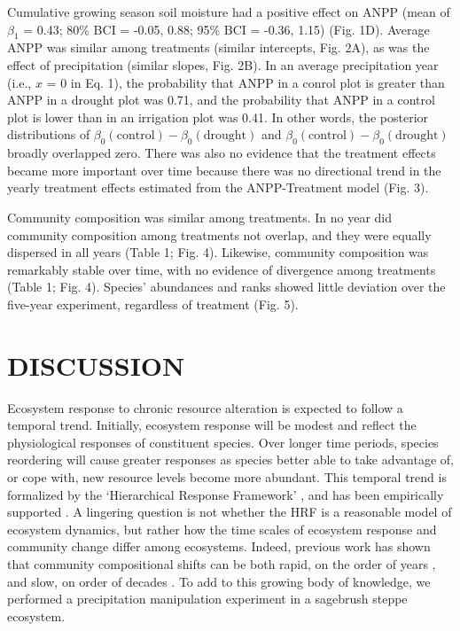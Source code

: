 \documentclass[fleqn,10pt]{wlpeerj} %
\begin{document}
Cumulative growing season soil moisture had a positive effect on ANPP
(mean of \(\beta_{1}\) = 0.43; 80\% BCI = -0.05, 0.88; 95\% BCI = -0.36,
1.15) (Fig. 1D). Average ANPP was similar among treatments (similar
intercepts, Fig. 2A), as was the effect of precipitation (similar
slopes, Fig. 2B). In an average precipitation year (i.e., \(x\) = 0 in
Eq. 1), the probability that ANPP in a conrol plot is greater than ANPP
in a drought plot was 0.71, and the probability that ANPP in a control
plot is lower than in an irrigation plot was 0.41. In other words, the
posterior distributions of
\(\beta_0(\text{control}) - \beta_0(\text{drought})\) and
\(\beta_0(\text{control}) - \beta_0(\text{drought})\) broadly overlapped
zero. There was also no evidence that the treatment effects became more
important over time because there was no directional trend in the yearly
treatment effects estimated from the ANPP-Treatment model (Fig. 3).

Community composition was similar among treatments. In no year did
community composition among treatments not overlap, and they were
equally dispersed in all years (Table 1; Fig. 4). Likewise, community
composition was remarkably stable over time, with no evidence of
divergence among treatments (Table 1; Fig. 4). Species' abundances and
ranks showed little deviation over the five-year experiment, regardless
of treatment (Fig. 5).

\section{DISCUSSION}\label{discussion}

Ecosystem response to chronic resource alteration is expected to follow
a temporal trend. Initially, ecosystem response will be modest and
reflect the physiological responses of constituent species. Over longer
time periods, species reordering will cause greater responses as species
better able to take advantage of, or cope with, new resource levels
become more abundant. This temporal trend is formalized by the
`Hierarchical Response Framework' \citep[HRF,][]{Smith2009}, and has
been empirically supported \citep{Knapp2012, Wilcox2016}. A lingering
question is not whether the HRF is a reasonable model of ecosystem
dynamics, but rather how the time scales of ecosystem response and
community change differ among ecosystems. Indeed, previous work has
shown that community compositional shifts can be both rapid, on the
order of years \citep{Hoover2014}, and slow, on order of decades
\citep{Knapp2012, Wilcox2016}. To add to this growing body of knowledge,
we performed a precipitation manipulation experiment in a sagebrush
steppe ecosystem.
\end{document}
